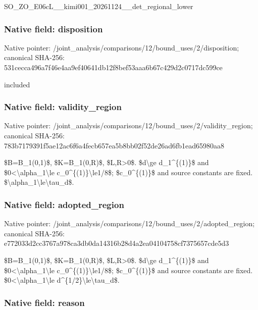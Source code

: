 \documentclass[10pt,a4paper]{article}
\begin{document}
SO\_ZO\_E06cL\_\_kimi001\_202\allowbreak{}61124\_\_det\_regional\_lowe\allowbreak{}r


\subsubsection{Native field: disposition}


Native pointer: /joint\_analysis/comparis\allowbreak{}ons/12/bound\_uses/2/disp\allowbreak{}osition; canonical SHA-256: 531cecca496a7f46e4aa9ef4\allowbreak{}0641db12f8bef53aaa6b67c4\allowbreak{}29d2c0717dc599ce


included


\subsubsection{Native field: validity\_region}


Native pointer: /joint\_analysis/comparis\allowbreak{}ons/12/bound\_uses/2/vali\allowbreak{}dity\_region; canonical SHA-256: 783b7179391f5ae12ac6f6a4\allowbreak{}fecb657ea5b8bb02f52de26a\allowbreak{}d6fb1ead65980aa8


\$B=B\_1(0,1)\$, \$K=B\_1(0,R)\$, \$L,R>0\$. \$d\textbackslash{}ge d\_1\textasciicircum{}\{(1)\}\$ and \$0<\textbackslash{}alpha\_1\textbackslash{}le c\_0\textasciicircum{}\{(1)\}\textbackslash{}le1/8\$; \$c\_0\textasciicircum{}\{(1)\}\$ and source constants are fixed. \$\textbackslash{}alpha\_1\textbackslash{}le\textbackslash{}tau\_d\$.


\subsubsection{Native field: adopted\_region}


Native pointer: /joint\_analysis/comparis\allowbreak{}ons/12/bound\_uses/2/adop\allowbreak{}ted\_region; canonical SHA-256: e772033d2cc3767a978ca3db\allowbreak{}0da14316b28d4a2ea0410475\allowbreak{}8cf7375657cde5d3


\$B=B\_1(0,1)\$, \$K=B\_1(0,R)\$, \$L,R>0\$. \$d\textbackslash{}ge d\_1\textasciicircum{}\{(1)\}\$ and \$0<\textbackslash{}alpha\_1\textbackslash{}le c\_0\textasciicircum{}\{(1)\}\textbackslash{}le1/8\$; \$c\_0\textasciicircum{}\{(1)\}\$ and source constants are fixed. \$0<\textbackslash{}alpha\_1\textbackslash{}le d\textasciicircum{}\{1/2\}\textbackslash{}le\textbackslash{}tau\_d\$.


\subsubsection{Native field: reason}
\end{document}
